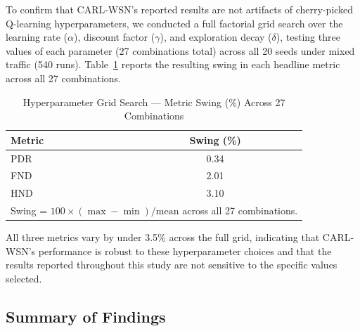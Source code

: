\documentclass[12pt]{article}
\begin{document}
To confirm that CARL-WSN's reported results are not artifacts of
cherry-picked Q-learning hyperparameters, we conducted a full
factorial grid search over the learning rate ($\alpha$), discount
factor ($\gamma$), and exploration decay ($\delta$), testing three
values of each parameter (27 combinations total) across all 20
seeds under mixed traffic (540 runs). Table~\ref{tab:hyperparam}
reports the resulting swing in each headline metric across all 27
combinations.

\begin{table}[!t]
\renewcommand{\arraystretch}{1.2}
\caption{Hyperparameter Grid Search --- Metric Swing (\%) Across 27 Combinations}
\label{tab:hyperparam}
\centering
\begin{tabular}{lc}
\hline
\textbf{Metric} & \textbf{Swing (\%)} \\
\hline
PDR  & 0.34 \\
FND  & 2.01 \\
HND  & 3.10 \\
\hline
\multicolumn{2}{l}{\footnotesize Swing = $100 \times (\max - \min)/\mathrm{mean}$ across all 27 combinations.} \\
\end{tabular}
\end{table}

All three metrics vary by under 3.5\% across the full grid,
indicating that CARL-WSN's performance is robust to these
hyperparameter choices and that the results reported throughout
this study are not sensitive to the specific values selected.

\subsection{Summary of Findings}
\end{document}
